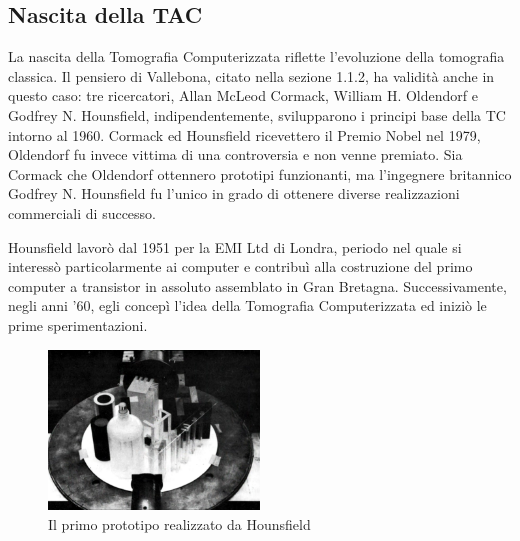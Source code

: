 \documentclass[a4paper,12pt, doubleside]{report}
\begin{document}
            \subsection{Nascita della TAC}
                \par      
                    La nascita della Tomografia Computerizzata riflette l'evoluzione della tomografia classica. Il pensiero di Vallebona, citato nella sezione 1.1.2, ha validità anche in questo caso: tre ricercatori, Allan McLeod Cormack, William H. Oldendorf e Godfrey N. Hounsfield, indipendentemente, svilupparono i principi base della TC intorno al 1960. Cormack ed Hounsfield ricevettero il Premio Nobel nel 1979, Oldendorf fu invece vittima di una controversia\cite{nobel-debate} e non venne premiato. 
                    Sia Cormack che Oldendorf ottennero prototipi funzionanti, ma l'ingegnere britannico Godfrey N. Hounsfield fu l'unico in grado di ottenere diverse realizzazioni commerciali di successo.
                \par
                    Hounsfield lavorò dal 1951 per la EMI Ltd di Londra, periodo nel quale si interessò particolarmente ai computer e contribuì alla costruzione del primo computer a transistor in assoluto assemblato in Gran Bretagna\cite{housfield-autobiografia}. Successivamente, negli anni '60, egli concepì l’idea della Tomografia Computerizzata ed iniziò le prime sperimentazioni.
                            
                    \begin{figure}[h]
                        \centering
                        \includegraphics[width=0.5\textwidth]{first-prototype}
                        \caption{Il primo prototipo realizzato da Hounsfield}
                        \label{fig:prototype}
                    \end{figure}
                            
\end{document}
